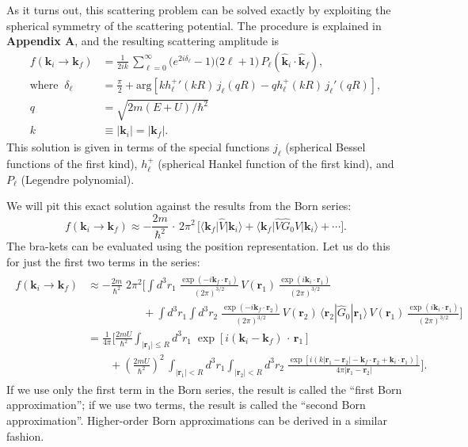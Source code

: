 \documentclass[pra,12pt]{revtex4}
\begin{document}
As it turns out, this scattering problem can be solved exactly by
exploiting the spherical symmetry of the scattering potential.  The
procedure is explained in \textbf{Appendix A}, and the resulting
scattering amplitude is
\begin{equation}
  \begin{aligned}f(\mathbf{k}_i \rightarrow \mathbf{k}_f) &= \frac{1}{2ik}\, \sum_{\ell =0}^\infty \big(e^{2i\delta_\ell} - 1\big) \big(2\ell+1\big)\, P_{\ell}(\hat{\mathbf{k}}_i\cdot \hat{\mathbf{k}}_f), \\ \mathrm{where}\;\; \delta_\ell &= \frac{\pi}{2} + \mathrm{arg}\!\left[k {h_\ell^+}'(kR) \, j_\ell(qR) - qh_\ell^+(kR)\, j_\ell'(qR)\right], \\ q &= \sqrt{2m(E+U)/\hbar^2} \\ k &\equiv |\mathbf{k}_i| = |\mathbf{k}_f|.\end{aligned}
\end{equation}
This solution is given in terms of the special functions $j_\ell$
(spherical Bessel functions of the first kind), $h_\ell^+$ (spherical
Hankel function of the first kind), and $P_\ell$ (Legendre
polynomial).

We will pit this exact solution against the results from the Born
series:
\begin{equation}
  f(\mathbf{k}_i\rightarrow \mathbf{k}_f) \approx - \frac{2m}{\hbar^2} \,\cdot \, 2\pi^2 \, \Bigg[\big\langle \mathbf{k}_f\big| \hat{V}|\mathbf{k}_i\big\rangle + \big\langle \mathbf{k}_f \big| \hat{V}\hat{G}_0 \hat{V} \big|\mathbf{k}_i\big\rangle + \cdots \Bigg].
\end{equation}
The bra-kets can be evaluated using the position representation.  Let
us do this for just the first two terms in the series:
\begin{align*}
  \begin{aligned}f(\mathbf{k}_i\rightarrow \mathbf{k}_f) &\approx - \frac{2m}{\hbar^2} \; 2\pi^2 \Bigg[\int d^3r_1\; \frac{\exp(-i\mathbf{k}_f \cdot \mathbf{r}_1)}{(2\pi)^{3/2}} \, V(\mathbf{r}_1) \, \frac{\exp(i\mathbf{k}_i \cdot \mathbf{r}_1)}{(2\pi)^{3/2}} \\&\qquad\qquad\quad + \int d^3r_1 \!\! \int d^3r_2 \; \frac{\exp(-i\mathbf{k}_f \cdot \mathbf{r}_2)}{(2\pi)^{3/2}} \, V(\mathbf{r}_2) \, \langle\mathbf{r}_2|\hat{G}_0|\mathbf{r}_1 \rangle \, V(\mathbf{r}_1)\, \frac{\exp(i\mathbf{k}_i \cdot \mathbf{r}_1)}{(2\pi)^{3/2}}\Bigg] \\ &= \frac{1}{4\pi} \Bigg[\frac{2mU}{\hbar^2} \int_{|\mathbf{r}_1| \le R} d^3r_1 \; \exp\left[i(\mathbf{k}_i-\mathbf{k}_f)\, \cdot\, \mathbf{r}_1\right] \\ &\qquad + \left(\frac{2mU}{\hbar^2}\right)^2\, \int_{|\mathbf{r}_1|<R} d^3 r_1 \int_{|\mathbf{r}_2|<R} d^3 r_2 \; \frac{\exp\left[i(k|\mathbf{r}_1-\mathbf{r}_2| - \mathbf{k}_f \cdot \mathbf{r}_2 +\mathbf{k}_i \cdot \mathbf{r}_1)\right]}{4\pi|\mathbf{r}_1-\mathbf{r}_2|} \Bigg]. \end{aligned}
\end{align*}
If we use only the first term in the Born series, the result is
called the ``first Born approximation''; if we use two terms, the
result is called the ``second Born approximation''.  Higher-order Born
approximations can be derived in a similar fashion.
\end{document}
